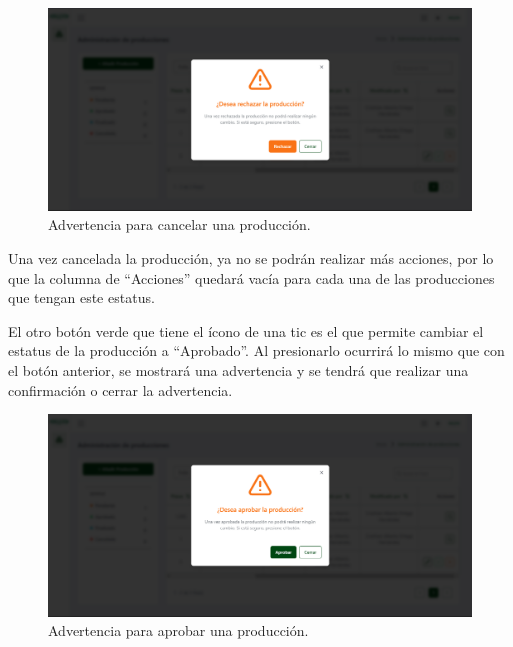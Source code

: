     \begin{figure}[H]
        \begin{center}
            \includegraphics[scale=0.33]{img/actividades/producciones/advertencia-cancelada.png}
            \caption{Advertencia para cancelar una producción.}
            \label{fig:advertencia-cancelada}
        \end{center}
    \end{figure}

Una vez cancelada la producción, ya no se podrán realizar más acciones, por lo que la columna de ``Acciones'' quedará vacía para cada una de las producciones que tengan este estatus.

El otro botón verde que tiene el ícono de una tic es el que permite cambiar el estatus de la producción a ``Aprobado''. Al presionarlo ocurrirá lo mismo que con el botón anterior, se mostrará una advertencia y se tendrá que realizar una confirmación o cerrar la advertencia.

    \begin{figure}[H]
        \begin{center}
            \includegraphics[scale=0.33]{img/actividades/producciones/advertencia-aprobado.png}
            \caption{Advertencia para aprobar una producción.}
            \label{fig:advertencia-aprobado}
        \end{center}
    \end{figure}


